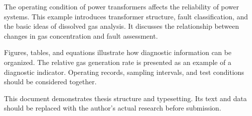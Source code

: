 \begin{abstract}
电力变压器的运行状态影响电力系统的可靠性。本文以变压器故障诊断为主题，介绍设备结构、故障分类及油中溶解气体分析的基本思路，讨论气体浓度变化与故障判断之间的联系。

本文通过图、表和公式展示诊断信息的组织方式，并给出相对产气速率的计算表达式。诊断过程需要结合设备运行记录、取样时间和试验条件，避免仅凭单一指标作出判断。

本示例用于演示论文结构与排版，正文和数据应在正式写作时替换为实际研究内容。
\end{abstract}

\begin{abstractEn}
The operating condition of power transformers affects the reliability of power systems. This example introduces transformer structure, fault classification, and the basic ideas of dissolved gas analysis. It discusses the relationship between changes in gas concentration and fault assessment.

Figures, tables, and equations illustrate how diagnostic information can be organized. The relative gas generation rate is presented as an example of a diagnostic indicator. Operating records, sampling intervals, and test conditions should be considered together.

This document demonstrates thesis structure and typesetting. Its text and data should be replaced with the author's actual research before submission.
\end{abstractEn}
